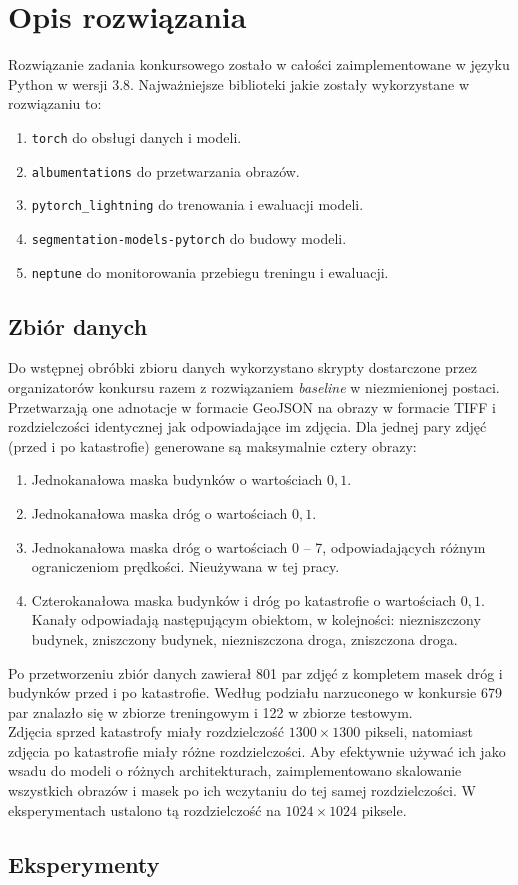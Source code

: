 \newpage %
\section{Opis rozwiązania}
Rozwiązanie zadania konkursowego zostało w całości zaimplementowane w języku Python w wersji 3.8. Najważniejsze biblioteki jakie zostały wykorzystane w rozwiązaniu to:
\begin{enumerate}
\item \texttt{torch} do obsługi danych i modeli.
\item \texttt{albumentations} do przetwarzania obrazów.
\item \texttt{pytorch\_lightning} do trenowania i ewaluacji modeli.
\item \texttt{segmentation-models-pytorch} do budowy modeli.
\item \texttt{neptune} do monitorowania przebiegu treningu i ewaluacji.
\end{enumerate}
\subsection{Zbiór danych}
Do wstępnej obróbki zbioru danych wykorzystano skrypty dostarczone przez organizatorów konkursu razem z rozwiązaniem \textit{baseline} w niezmienionej postaci. Przetwarzają one adnotacje w formacie GeoJSON na obrazy w formacie TIFF i rozdzielczości identycznej jak odpowiadające im zdjęcia. Dla jednej pary zdjęć (przed i po katastrofie) generowane są maksymalnie cztery obrazy:
\begin{enumerate}
\item Jednokanałowa maska budynków o wartościach $0, 1$.
\item Jednokanałowa maska dróg o wartościach $0, 1$.
\item Jednokanałowa maska dróg o wartościach 0 -- 7, odpowiadających różnym ograniczeniom prędkości. Nieużywana w tej pracy.
\item Czterokanałowa maska budynków i dróg po katastrofie o wartościach $0, 1$. Kanały odpowiadają następującym obiektom, w kolejności: niezniszczony budynek, zniszczony budynek, niezniszczona droga, zniszczona droga.
\end{enumerate}
Po przetworzeniu zbiór danych zawierał 801 par zdjęć z kompletem masek dróg i budynków przed i po katastrofie. Według podziału narzuconego w konkursie 679 par znalazło się w zbiorze treningowym i 122 w zbiorze testowym.\\
Zdjęcia sprzed katastrofy miały rozdzielczość $1300\times 1300$ pikseli, natomiast zdjęcia po katastrofie miały różne rozdzielczości. Aby efektywnie używać ich jako wsadu do modeli o różnych architekturach, zaimplementowano skalowanie wszystkich obrazów i masek po ich wczytaniu do tej samej rozdzielczości. W eksperymentach ustalono tą rozdzielczość na $1024\times 1024$ piksele.
\subsection{Eksperymenty}


